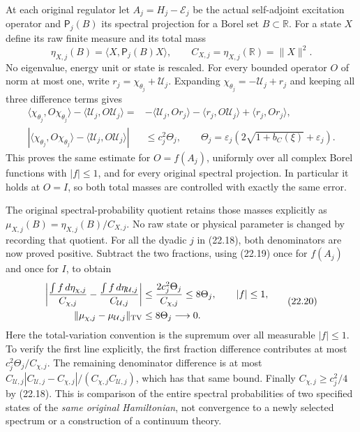 \documentclass[
]{article}
\begin{document}
At each original regulator let \(A_j=H_j-\mathcal E_j\) be the actual
self-adjoint excitation operator and \(\mathsf P_j(B)\) its spectral
projection for a Borel set \(B\subset\mathbb R\). For a state \(X\)
define its raw finite measure and its total mass \[
\eta_{X,j}(B)=\langle X,\mathsf P_j(B)X\rangle,\qquad
C_{X,j}=\eta_{X,j}(\mathbb R)=\|X\|^2.
\] No eigenvalue, energy unit or state is rescaled. For every bounded
operator \(O\) of norm at most one, write
\(r_j=\chi_{\theta_j}+\mathcal U_j\). Expanding
\(\chi_{\theta_j}=-\mathcal U_j+r_j\) and keeping all three difference
terms gives \[
\begin{aligned}
\langle\chi_{\theta_j},O\chi_{\theta_j}\rangle
 -\langle\mathcal U_j,O\mathcal U_j\rangle
={}&-\langle\mathcal U_j,Or_j\rangle
       -\langle r_j,O\mathcal U_j\rangle+\langle r_j,Or_j\rangle,\\
\left|\langle\chi_{\theta_j},O\chi_{\theta_j}\rangle
 -\langle\mathcal U_j,O\mathcal U_j\rangle\right|
 &\le c_j^2\Theta_j,\qquad
\Theta_j=\varepsilon_j(2\sqrt{1+b_C(\xi)}+\varepsilon_j).
\end{aligned}                                                   \tag{22.19}
\] This proves the same estimate for \(O=f(A_j)\), uniformly over all
complex Borel functions with \(|f|\le1\), and for every original
spectral projection. In particular it holds at \(O=I\), so both total
masses are controlled with exactly the same error.

The original spectral-probability quotient retains those masses
explicitly as \(\mu_{X,j}(B)=\eta_{X,j}(B)/C_{X,j}\). No raw state or
physical parameter is changed by recording that quotient. For all the
dyadic \(j\) in (22.18), both denominators are now proved positive.
Subtract the two fractions, using (22.19) once for \(f(A_j)\) and once
for \(I\), to obtain \[
\begin{aligned}
\left|
\frac{\int f\,d\eta_{\chi,j}}{C_{\chi,j}}
 -\frac{\int f\,d\eta_{\mathcal U,j}}{C_{\mathcal U,j}}
\right|
&\le\frac{2c_j^2\Theta_j}{C_{\chi,j}}
\le8\Theta_j,\qquad |f|\le1,\\
\|\mu_{\chi,j}-\mu_{\mathcal U,j}\|_{\rm TV}
&\le8\Theta_j\longrightarrow0 .
\end{aligned}                                                   \tag{22.20}
\] Here the total-variation convention is the supremum over all
measurable \(|f|\le1\). To verify the first line explicitly, the first
fraction difference contributes at most \(c_j^2\Theta_j/C_{\chi,j}\).
The remaining denominator difference is at most
\(C_{\mathcal U,j}|C_{\mathcal U,j}-C_{\chi,j}|/
(C_{\chi,j}C_{\mathcal U,j})\), which has that same bound. Finally
\(C_{\chi,j}\ge c_j^2/4\) by (22.18). This is comparison of the entire
spectral probabilities of two specified states of the \emph{same
original Hamiltonian}, not convergence to a newly selected spectrum or a
construction of a continuum theory.
\end{document}
